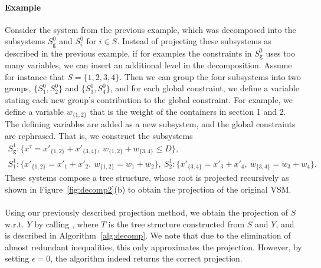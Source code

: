 \documentclass{llncs}
\newcommand{\trt}[1]{\texttt{#1}}
\begin{document}
\paragraph{Example}
Consider the system from the previous example, which was decomposed into the subsystems $S^0_\trt{g}$ and $S^0_i$ for $i\in S$. Instead of projecting these subsystems as described in the previous example, if for examples the constraints in $S^0_\texttt{g}$ uses too many variables, we can insert an additional level in the decomposition. 
Assume for instance that $S=\{1,2,3,4\}$. Then we can group the four subsystems into two groups, $\{S^0_1, S^0_2\}$ and $\{S^0_3, S^0_4\}$, and for each global constraint, we define a variable stating each new group's contribution to the global constraint. For example, we define a variable $w_{\{1,2\}}$ that is the weight of the containers in section 1 and 2. The defining variables are added as a new subsystem, and the global constraints are rephrased. That is, we construct the subsystems %
\footnotesize{
\[
\begin{gathered}
S_\trt{g}^1 :\{ x^\tau = x'_{\{1,2\}} + x'_{\{3,4\}},\: w_{\{1,2\}} + w_{\{3,4\}} \leq D \},\\   
S^1_1				:\{ x'_{\{1,2\}} = x'_{1} + x'_{2},\: w_{\{1,2\}} = w_{1} + w_{2}\},\:
S^1_2				:\{ x'_{\{3,4\}} = x'_{3} + x'_{4},\: w_{\{3,4\}} = w_{3} + w_{4}\}. 
\end{gathered}
\]}
\normalsize{These systems compose a tree structure, whose root is projected recursively as shown in Figure~\ref{fig:decomp2}(b) to obtain the projection of the original VSM.}
\\\\
Using our previously described projection method, we obtain the projection of $S$ w.r.t. $Y$ by calling , where $T$ is the tree structure constructed from $S$ and $Y$, and  is described in Algorithm~\ref{alg:decomp}. We note that due to the elimination of almost redundant inequalities, this only approximates the projection. However, by setting $\epsilon = 0$, the algorithm indeed returns the correct projection.
\end{document}
